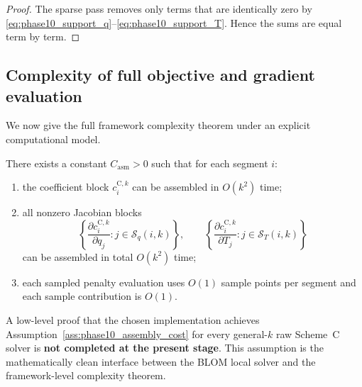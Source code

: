 \begin{proof}
The sparse pass removes only terms that are identically zero by \eqref{eq:phase10_support_q}--\eqref{eq:phase10_support_T}. Hence the sums are equal term by term.
\end{proof}

\subsection{Complexity of full objective and gradient evaluation}
\label{subsec:phase10_complexity}

We now give the full framework complexity theorem under an explicit computational model.

\begin{assumption}
\label{ass:phase10_assembly_cost}
There exists a constant \(C_{\mathrm{asm}}>0\) such that for each segment \(i\):
\begin{enumerate}
    \item the coefficient block \(c_i^{\mathrm{C},k}\) can be assembled in \(O(k^2)\) time;
    \item all nonzero Jacobian blocks
    \[
    \left\{
    \frac{\partial c_i^{\mathrm{C},k}}{\partial q_j}
    : j\in \mathcal S_q(i,k)
    \right\},
    \qquad
    \left\{
    \frac{\partial c_i^{\mathrm{C},k}}{\partial T_j}
    : j\in \mathcal S_T(i,k)
    \right\}
    \]
    can be assembled in total \(O(k^2)\) time;
    \item each sampled penalty evaluation uses \(O(1)\) sample points per segment and each sample contribution is \(O(1)\).
\end{enumerate}
\end{assumption}

\begin{remark}
\label{rem:phase10_assembly_cost_status}
A low-level proof that the chosen implementation achieves Assumption~\ref{ass:phase10_assembly_cost} for every general-\(k\) raw Scheme~C solver is \textbf{not completed at the present stage}.
This assumption is the mathematically clean interface between the BLOM local solver and the framework-level complexity theorem.
\end{remark}

